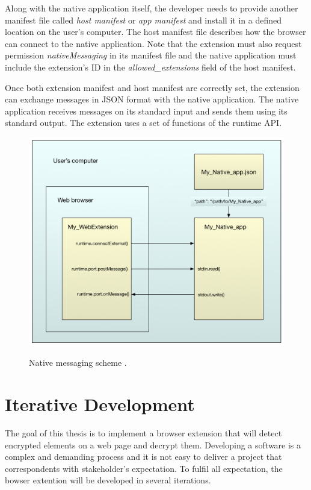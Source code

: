 Along with the native application itself, the developer needs to provide another manifest file called \textit{host manifest} or \textit{app manifest} and install it in a defined location on the user's computer. The host manifest file describes how the browser can connect to the native application. Note that the extension must also request permission \textit{nativeMessaging} in its manifest file and the native application must include the extension's ID in the \textit{allowed\_extensions} field of the host manifest.

Once both extension manifest and host manifest are correctly set, the extension can exchange messages in JSON format with the native application. The native application receives messages on its standard input and sends them using its standard output. The extension uses a set of functions of the runtime API.

\begin{figure}[H]
    \begin{center}
        \label{img:extensionAnatomy}
        \includegraphics[width=1.0\textwidth]{obrazky-figures/native-messaging.png}
        \caption{Native messaging scheme \cite{extensionNativeMessaging}.}
    \end{center}
\end{figure}

\chapter{Iterative Development}
The goal of this thesis is to implement a browser extension that will detect encrypted elements on a web page and decrypt them. Developing a software is a complex and demanding process and it is not easy to deliver a project that correspondents with stakeholder's expectation. To fulfil all expectation, the bowser extention will be developed in several iterations.

